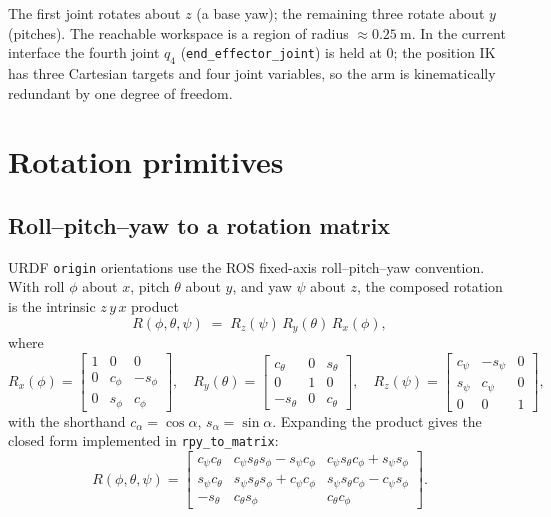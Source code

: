\documentclass[11pt]{article}
\newcommand{\Rx}{R_x}
\newcommand{\Ry}{R_y}
\newcommand{\Rz}{R_z}
\begin{document}
The first joint rotates about $z$ (a base yaw); the remaining three rotate
about $y$ (pitches). The reachable workspace is a region of radius
$\approx \SI{0.25}{\meter}$. In the current interface the fourth joint
$q_4$ (\texttt{end\_effector\_joint}) is held at $0$; the position IK has
three Cartesian targets and four joint variables, so the arm is kinematically
redundant by one degree of freedom.

\section{Rotation primitives}

\subsection{Roll--pitch--yaw to a rotation matrix}

URDF \texttt{origin} orientations use the ROS fixed-axis roll--pitch--yaw
convention. With roll $\phi$ about $x$, pitch $\theta$ about $y$, and yaw
$\psi$ about $z$, the composed rotation is the intrinsic $z\,y\,x$ product
\begin{equation}
R(\phi,\theta,\psi) \;=\; \Rz(\psi)\,\Ry(\theta)\,\Rx(\phi),
\end{equation}
where
\[
\Rx(\phi)=\begin{bmatrix}1&0&0\\0&c_\phi&-s_\phi\\0&s_\phi&c_\phi\end{bmatrix},\quad
\Ry(\theta)=\begin{bmatrix}c_\theta&0&s_\theta\\0&1&0\\-s_\theta&0&c_\theta\end{bmatrix},\quad
\Rz(\psi)=\begin{bmatrix}c_\psi&-s_\psi&0\\s_\psi&c_\psi&0\\0&0&1\end{bmatrix},
\]
with the shorthand $c_\alpha=\cos\alpha$, $s_\alpha=\sin\alpha$. Expanding the
product gives the closed form implemented in \texttt{rpy\_to\_matrix}:
\begin{equation}
R(\phi,\theta,\psi)=
\begin{bmatrix}
c_\psi c_\theta & c_\psi s_\theta s_\phi - s_\psi c_\phi & c_\psi s_\theta c_\phi + s_\psi s_\phi \\
s_\psi c_\theta & s_\psi s_\theta s_\phi + c_\psi c_\phi & s_\psi s_\theta c_\phi - c_\psi s_\phi \\
-s_\theta       & c_\theta s_\phi                        & c_\theta c_\phi
\end{bmatrix}.
\end{equation}
\end{document}
